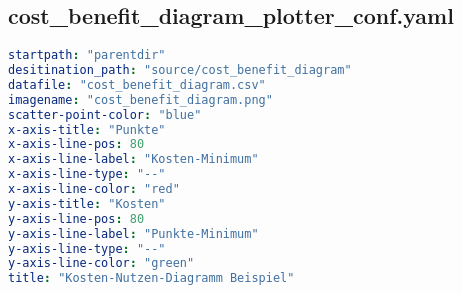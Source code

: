 
\subsection{cost\_benefit\_diagram\_plotter\_conf.yaml}
\lstset{style=gra_codestyle}
\begin{lstlisting}[language=yaml, caption=Python LaTex - cost\_benefit\_diagram\_plotter\_conf.yaml - Konfigurationsdatei - Kosten-Nutzen-Diagramm,captionpos=b,label={lst:zotero_bibtex_configuration},breaklines=true]
startpath: "parentdir"
desitination_path: "source/cost_benefit_diagram"
datafile: "cost_benefit_diagram.csv"
imagename: "cost_benefit_diagram.png"
scatter-point-color: "blue"
x-axis-title: "Punkte"
x-axis-line-pos: 80
x-axis-line-label: "Kosten-Minimum"
x-axis-line-type: "--"
x-axis-line-color: "red"
y-axis-title: "Kosten"
y-axis-line-pos: 80
y-axis-line-label: "Punkte-Minimum"
y-axis-line-type: "--"
y-axis-line-color: "green"
title: "Kosten-Nutzen-Diagramm Beispiel"
\end{lstlisting}